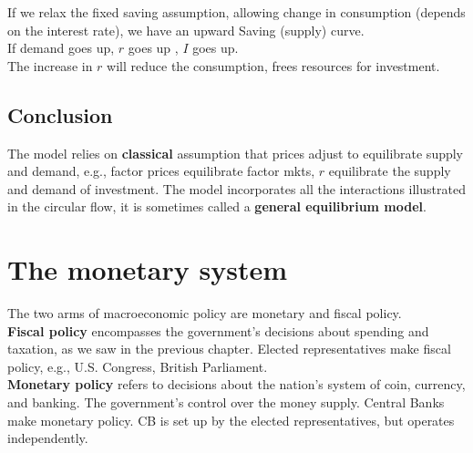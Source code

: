 \documentclass[12pt]{article}
\begin{document}
If we relax the fixed saving assumption, allowing change in consumption (depends on
the interest rate), we have an upward Saving (supply) curve.\\
If demand goes up, $ r $ goes up , $ I $ goes up.\\
The increase in $ r $ will reduce the consumption, frees resources for investment.

\begin{figure}[H]
\end{figure}




\subsection{Conclusion}
The model relies on {\textbf {classical}} assumption that prices adjust to equilibrate
supply and demand, e.g., factor prices equilibrate factor mkts, $ r $ equilibrate the
supply and demand of investment.
The model incorporates all the interactions illustrated in the circular flow, it is
sometimes called a {\textbf {general equilibrium model}}.




\section{The monetary system}

The two arms of macroeconomic policy are monetary and fiscal policy.\\
{\textbf {Fiscal policy}} encompasses the government’s decisions about spending and 
taxation, as we saw in the previous chapter. Elected representatives make fiscal policy,
e.g., U.S. Congress, British Parliament.\\
{\textbf {Monetary policy}} refers to decisions about the nation’s system of coin,
currency, and banking. The government's control over the money supply. Central Banks 
make monetary policy. CB is set up by the elected representatives, but operates 
independently.
\end{document}
